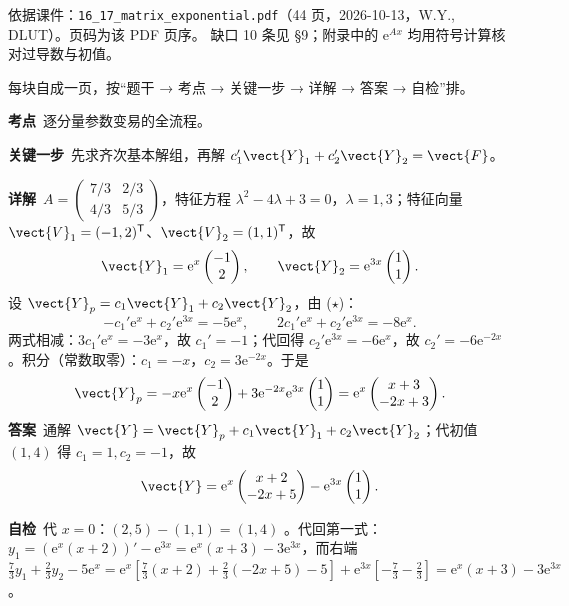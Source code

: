 \documentclass[11pt]{ctexart}
\renewcommand{\qbreak}{\needspace{0.26\textheight}}
\newcommand{\mat}[1]{\begin{pmatrix}#1\end{pmatrix}}
\begin{document}
\flowerrule

{\small\color{inkgray}
依据课件：\texttt{16\_17\_matrix\_exponential.pdf}（44 页，2026-10-13，W.Y., DLUT）。页码为该 PDF 页序。
缺口 10 条见 §9；附录中的 $\mathrm{e}^{Ax}$ 均用符号计算核对过导数与初值。}

每块自成一页，按“题干 → 考点 → 关键一步 → 详解 → 答案 → 自检”排。

\qbreak
{}
\label{c4:app:ex1}
\qbreak
{}
\par\textbf{考点}\ 逐分量参数变易的全流程。
\par\textbf{关键一步}\ 先求齐次基本解组，再解 $c_1'\vect{Y}_1+c_2'\vect{Y}_2=\vect{F}$。
\par\textbf{详解}\ $A=\mat{7/3&2/3\\4/3&5/3}$，特征方程 $\lambda^2-4\lambda+3=0$，$\lambda=1,3$；特征向量 $\vect{V}_1=(-1,2)^{\mathsf T}$、$\vect{V}_2=(1,1)^{\mathsf T}$，故
\[
\vect{Y}_1=\mathrm{e}^{x}\mat{-1\\2},\qquad \vect{Y}_2=\mathrm{e}^{3x}\mat{1\\1}.
\]
设 $\vect{Y}_p=c_1\vect{Y}_1+c_2\vect{Y}_2$，由 ($\star$)：
\[
-c_1'\mathrm{e}^x+c_2'\mathrm{e}^{3x}=-5\mathrm{e}^x,\qquad
2c_1'\mathrm{e}^x+c_2'\mathrm{e}^{3x}=-8\mathrm{e}^x .
\]
两式相减：$3c_1'\mathrm{e}^x=-3\mathrm{e}^x$，故 $c_1'=-1$；代回得 $c_2'\mathrm{e}^{3x}=-6\mathrm{e}^x$，故 $c_2'=-6\mathrm{e}^{-2x}$。积分（常数取零）：$c_1=-x$，$c_2=3\mathrm{e}^{-2x}$。于是
\[
\vect{Y}_p=-x\mathrm{e}^x\mat{-1\\2}+3\mathrm{e}^{-2x}\mathrm{e}^{3x}\mat{1\\1}=\mathrm{e}^x\mat{x+3\\-2x+3}.
\]
\textbf{答案}\ 通解 $\vect{Y}=\vect{Y}_p+c_1\vect{Y}_1+c_2\vect{Y}_2$；代初值 $(1,4)$ 得 $c_1=1,c_2=-1$，故
\[
\vect{Y}=\mathrm{e}^x\mat{x+2\\-2x+5}-\mathrm{e}^{3x}\mat{1\\1}.
\]
\par\textbf{自检}\ 代 $x=0$：$(2,5)-(1,1)=(1,4)$ 。代回第一式：$y_1=(\mathrm{e}^x(x+2))'-\mathrm{e}^{3x}=\mathrm{e}^x(x+3)-3\mathrm{e}^{3x}$，而右端 $\tfrac73y_1+\tfrac23y_2-5\mathrm{e}^x=\mathrm{e}^x[\tfrac73(x+2)+\tfrac23(-2x+5)-5]+\mathrm{e}^{3x}[-\tfrac73-\tfrac23]=\mathrm{e}^x(x+3)-3\mathrm{e}^{3x}$ 。
\end{document}
